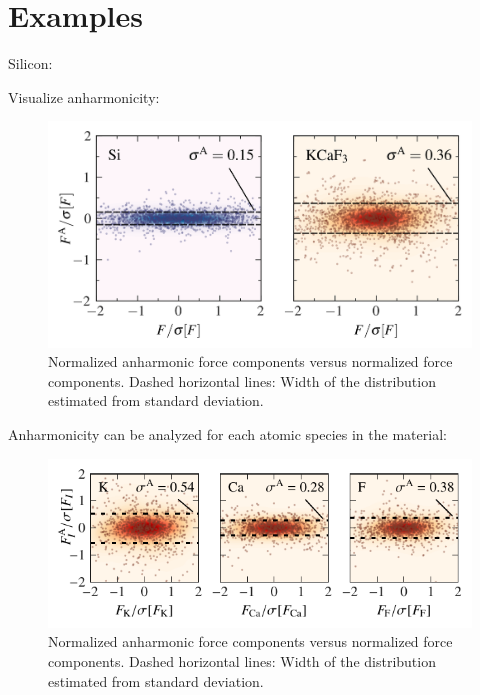 \section{Examples}



Silicon:


Visualize anharmonicity:

\begin{figure}
	\includegraphics[width=\textwidth]{./data/plots/anharmonicity/5_density_plots/histogram_annotated.png}
	\caption{
		Normalized anharmonic force components versus normalized force components. Dashed horizontal lines: Width of the distribution estimated from standard deviation.
	}
\end{figure}

Anharmonicity can be analyzed for each atomic species in the material:

\begin{figure}
	\includegraphics[width=\textwidth]{./data/plots/anharmonicity/5_density_plots/histogram_atoms.pdf}
	\caption{
		Normalized anharmonic force components versus normalized force components. Dashed horizontal lines: Width of the distribution estimated from standard deviation.
	}
\end{figure}

